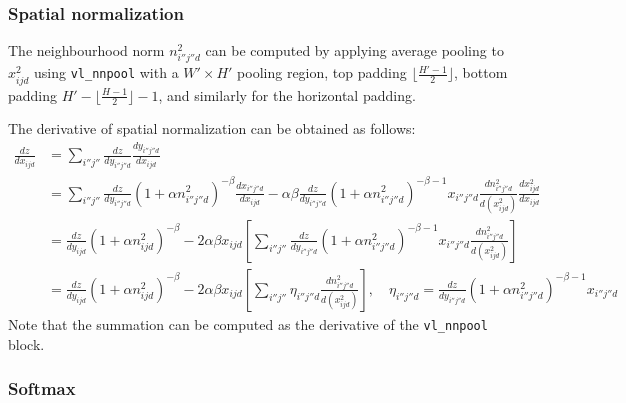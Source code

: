 \subsubsection{Spatial normalization}\label{s:impl-spnorm}

The neighbourhood norm $n^2_{i''j''d}$ can be computed by applying average pooling to $x_{ijd}^2$ using \verb!vl_nnpool! with a $W'\times H'$ pooling region, top padding $\lfloor \frac{H'-1}{2}\rfloor$, bottom padding $H'-\lfloor \frac{H-1}{2}\rfloor-1$, and similarly for the horizontal padding.

The derivative of spatial normalization can be obtained as follows:
\begin{align*}
\frac{dz}{dx_{ijd}} 
&= \sum_{i''j''}
\frac{dz}{d y_{i''j''d}} 
\frac{d y_{i''j''d}}{d x_{ijd}}
\\
&=
\sum_{i''j''}
\frac{dz}{d y_{i''j''d}} 
(1 + \alpha n_{i''j''d}^2)^{-\beta}
\frac{dx_{i''j''d}}{d x_{ijd}} 
-\alpha\beta
\frac{dz}{d y_{i''j''d}} 
(1 + \alpha n_{i''j''d}^2)^{-\beta-1}
x_{i''j''d}
\frac{dn_{i''j''d}^2}{d (x^2_{ijd})} 
\frac{dx^2_{ijd}}{d x_{ijd}}
\\
&=
\frac{dz}{d y_{ijd}} 
(1 + \alpha n_{ijd}^2)^{-\beta}
-2\alpha\beta x_{ijd}
\left[
\sum_{i''j''}
\frac{dz}{d y_{i''j''d}} 
(1 + \alpha n_{i''j''d}^2)^{-\beta-1}
x_{i''j''d}
\frac{dn_{i''j''d}^2}{d (x_{ijd}^2)}
\right]
\\
&=
\frac{dz}{d y_{ijd}} 
(1 + \alpha n_{ijd}^2)^{-\beta}
-2\alpha\beta x_{ijd}
\left[
\sum_{i''j''}
\eta_{i''j''d}
\frac{dn_{i''j''d}^2}{d (x_{ijd}^2)}
\right],
\quad
\eta_{i''j''d}=
\frac{dz}{d y_{i''j''d}} 
(1 + \alpha n_{i''j''d}^2)^{-\beta-1}
x_{i''j''d}
\end{align*}
Note that the summation can be computed as the derivative of the
\verb!vl_nnpool! block.

\subsubsection{Softmax}\label{s:impl-softmax}

